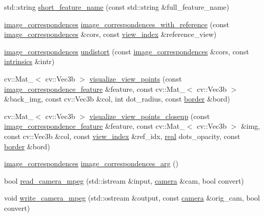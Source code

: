 \begin{DoxyCompactItemize}
\item 
std\+::string \hyperlink{namespacetlz_a322d5c4e810a487f114fd4a5e7dcf826}{short\+\_\+feature\+\_\+name} (const std\+::string \&full\+\_\+feature\+\_\+name)
\item 
\hyperlink{structtlz_1_1image__correspondences}{image\+\_\+correspondences} \hyperlink{namespacetlz_ae26f7675ecb867cba4f721a2533bceb6}{image\+\_\+correspondences\+\_\+with\+\_\+reference} (const \hyperlink{structtlz_1_1image__correspondences}{image\+\_\+correspondences} \&cors, const \hyperlink{structtlz_1_1view__index}{view\+\_\+index} \&reference\+\_\+view)
\item 
\hyperlink{structtlz_1_1image__correspondences}{image\+\_\+correspondences} \hyperlink{namespacetlz_a7b2f763ca7c6cba833a13225c93ad55c}{undistort} (const \hyperlink{structtlz_1_1image__correspondences}{image\+\_\+correspondences} \&cors, const \hyperlink{structtlz_1_1intrinsics}{intrinsics} \&intr)
\item 
cv\+::\+Mat\+\_\+$<$ cv\+::\+Vec3b $>$ \hyperlink{namespacetlz_abf1d01f09b5e0671d1538ea8259cdb1e}{visualize\+\_\+view\+\_\+points} (const \hyperlink{structtlz_1_1image__correspondence__feature}{image\+\_\+correspondence\+\_\+feature} \&feature, const cv\+::\+Mat\+\_\+$<$ cv\+::\+Vec3b $>$ \&back\+\_\+img, const cv\+::\+Vec3b \&col, int dot\+\_\+radius, const \hyperlink{structtlz_1_1border}{border} \&bord)
\item 
cv\+::\+Mat\+\_\+$<$ cv\+::\+Vec3b $>$ \hyperlink{namespacetlz_a7f1e6601e70df95f0c06c82252c66e1b}{visualize\+\_\+view\+\_\+points\+\_\+closeup} (const \hyperlink{structtlz_1_1image__correspondence__feature}{image\+\_\+correspondence\+\_\+feature} \&feature, const cv\+::\+Mat\+\_\+$<$ cv\+::\+Vec3b $>$ \&img, const cv\+::\+Vec3b \&col, const \hyperlink{structtlz_1_1view__index}{view\+\_\+index} \&ref\+\_\+idx, \hyperlink{namespacetlz_a15fd37cce97f2b8b606af18c2615f602}{real} dots\+\_\+opacity, const \hyperlink{structtlz_1_1border}{border} \&bord)
\item 
\hyperlink{structtlz_1_1image__correspondences}{image\+\_\+correspondences} \hyperlink{namespacetlz_a11d8bb3ca89f4957bfde1cd0d5429a16}{image\+\_\+correspondences\+\_\+arg} ()
\item 
bool \hyperlink{namespacetlz_a79d6cd7de20e9ff041c3ea29b9458d88}{read\+\_\+camera\+\_\+mpeg} (std\+::istream \&input, \hyperlink{structtlz_1_1camera}{camera} \&cam, bool convert)
\item 
void \hyperlink{namespacetlz_a2c4e4f4fac6af7d8e52426e4ca546ffc}{write\+\_\+camera\+\_\+mpeg} (std\+::ostream \&output, const \hyperlink{structtlz_1_1camera}{camera} \&orig\+\_\+cam, bool convert)

\end{DoxyCompactItemize}
